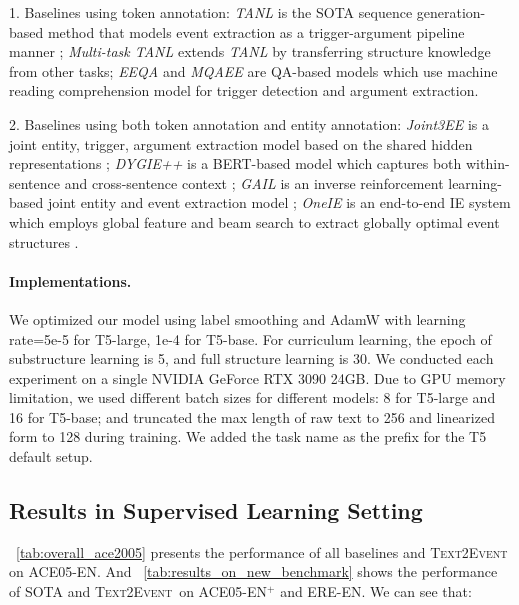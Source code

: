 \documentclass[11pt,a4paper]{article}
\newcommand\modelname{\textsc{Text2Event}}
\begin{document}
1. Baselines using token annotation:
\textit{TANL} is the SOTA sequence generation-based method that models event extraction as a trigger-argument pipeline manner \citep{paolini2021structured};
\textit{Multi-task TANL} extends \textit{TANL} by transferring structure knowledge from other tasks;
\textit{EEQA} \citep{du-cardie-2020-event} and \textit{MQAEE} \citep{li-etal-2020-event} are QA-based models which use machine reading comprehension model for trigger detection and argument extraction.

2. Baselines using both token annotation and entity annotation:
\textit{Joint3EE} is a joint entity, trigger, argument extraction model based on the shared hidden representations \citep{Nguyen-Nguyen:2019:AAAI2019};
\textit{DYGIE++} is a BERT-based model which captures both within-sentence and cross-sentence context \citep{wadden-etal-2019-entity};
\textit{GAIL} is an inverse reinforcement learning-based joint entity and event extraction model \citep{Zhang:2019:GAIL};
\textit{OneIE} is an end-to-end IE system which employs global feature and beam search to extract globally optimal event structures \citep{lin-etal-2020-joint}.

\paragraph{Implementations.}
We optimized our model using label smoothing \citep{7780677,MullerKH19} and AdamW \citep{loshchilov2018decoupled} with learning rate=5e-5 for T5-large, 1e-4 for T5-base.
For curriculum learning, the epoch of substructure learning is 5, and full structure learning is 30.
We conducted each experiment on a single NVIDIA GeForce RTX 3090 24GB.
Due to GPU memory limitation, we used different batch sizes for different models: 8 for T5-large and 16 for T5-base; and truncated the max length of raw text to 256 and linearized form to 128 during training.
We added the task name as the prefix for the T5 default setup.

\subsection{Results in Supervised Learning Setting} \label{sec:supervised_learning_results}


\tablename~\ref{tab:overall_ace2005} presents the performance of all baselines and \modelname\, on ACE05-EN.
And \tablename~\ref{tab:results_on_new_benchmark} shows the performance of SOTA and \modelname\, on ACE05-EN$^{+}$ and ERE-EN.
We can see that:
\end{document}
